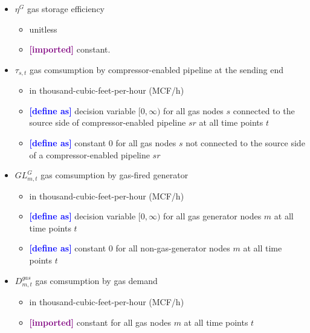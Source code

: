 \documentclass{article}
\newcommand{\define}{\textcolor{blue}{\textbf{[define as] }}}
\newcommand{\imported}{\textcolor{purple}{\textbf{[imported] }}}
\begin{document}
\begin{itemize}
\item $\eta^G$ gas storage efficiency
  \begin{itemize}
  \item unitless
  \item \imported constant.
  \end{itemize}

\item $\tau_{s,t}$ gas comsumption by compressor-enabled pipeline at the sending
  end
  \begin{itemize}
  \item in thousand-cubic-feet-per-hour (MCF/h)
  \item \define decision variable $[0, \infty)$ for all gas nodes $s$ connected
    to the source side of compressor-enabled pipeline $sr$ at all time points
    $t$
  \item \define constant $0$ for all gas nodes $s$ not connected to the source
    side of a compressor-enabled pipeline $sr$
  \end{itemize}

\item $GL^G_{m,t}$ gas comsumption by gas-fired generator
  \begin{itemize}
  \item in thousand-cubic-feet-per-hour (MCF/h)
  \item \define decision variable $[0, \infty)$ for all gas generator nodes $m$
    at all time points $t$
  \item \define constant $0$ for all non-gas-generator nodes $m$ at all time
    points $t$
  \end{itemize}

\item $D^{gas}_{m,t}$ gas comsumption by gas demand
  \begin{itemize}
  \item in thousand-cubic-feet-per-hour (MCF/h)
  \item \imported constant for all gas nodes $m$ at all time points $t$
  \end{itemize}
\end{itemize}
\end{document}
